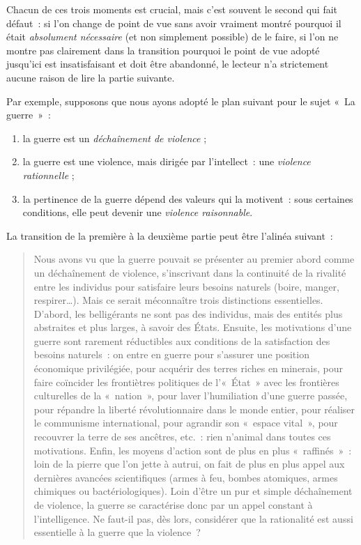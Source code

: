 \documentclass[a4paper,12pt]{report}
\begin{document}
Chacun de ces trois moments est crucial, mais c'est souvent le second
qui fait défaut : si l'on change de point de vue sans avoir vraiment
montré pourquoi il était \emph{absolument nécessaire} (et non simplement
possible) de le faire, si l'on ne montre pas clairement dans la
transition pourquoi le point de vue adopté jusqu'ici est insatisfaisant
et doit être abandonné, le lecteur n'a strictement aucune raison de lire
la partie suivante.

Par exemple, supposons que nous ayons adopté le plan suivant pour le
sujet « La guerre » :

\begin{enumerate}
\item la guerre est un \emph{déchaînement de violence} ;

\item la guerre est une violence, mais dirigée par l'intellect : une
\emph{violence rationnelle} ;

\item la pertinence de la guerre dépend des valeurs qui la motivent : sous
certaines conditions, elle peut devenir une \emph{violence raisonnable}.
\end{enumerate}

\noindent La transition de la première à la deuxième partie peut être
l'alinéa suivant :

\begin{quote}
Nous avons vu que la guerre pouvait se présenter au premier abord
comme un déchaînement de violence, s'inscrivant dans la continuité de
la rivalité entre les individus pour satisfaire leurs besoins naturels
(boire, manger, respirer\ldots{}). Mais ce serait méconnaître trois
distinctions essentielles. D'abord, les belligérants ne sont pas des
individus, mais des entités plus abstraites et plus larges, à savoir
des États. Ensuite, les motivations d'une guerre sont rarement
réductibles aux conditions de la satisfaction des besoins naturels :
on entre en guerre pour s'assurer une position économique privilégiée,
pour acquérir des terres riches en minerais, pour faire coïncider les
frontiètres politiques de l'« État » avec les frontières culturelles de
la « nation », pour laver l'humiliation d'une guerre passée, pour
répandre la liberté révolutionnaire dans le monde entier, pour
réaliser le communisme international, pour agrandir son « espace
vital », pour recouvrer la terre de ses ancêtres, etc. : rien n'animal
dans toutes ces motivations. Enfin, les moyens d'action sont de plus
en plus « raffinés » : loin de la pierre que l'on jette à autrui, on
fait de plus en plus appel aux dernières avancées scientifiques (armes
à feu, bombes atomiques, armes chimiques ou bactériologiques). Loin
d'être un pur et simple déchaînement de violence, la guerre se
caractérise donc par un appel constant à l'intelligence. Ne faut-il
pas, dès lors, considérer que la rationalité est aussi essentielle à
la guerre que la violence ?
\end{quote}
\end{document}
